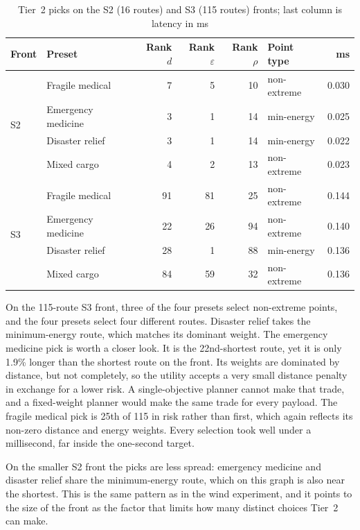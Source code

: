 \documentclass{ssnreview}
\begin{document}
\begin{table}[H]
\centering\caption{Tier~2 picks on the S2 (16 routes) and S3 (115 routes) fronts; last column is latency in ms}\label{tab:tier2}\footnotesize\setlength{\tabcolsep}{4pt}
\begin{tabular}{l l r r r l r}
\toprule
\textbf{Front} & \textbf{Preset} & \textbf{Rank $d$} & \textbf{Rank $\varepsilon$} & \textbf{Rank $\rho$} & \textbf{Point type} & \textbf{ms}\\
\midrule
\multirow{4}{*}{S2} & Fragile medical    & 7  & 5  & 10 & non-extreme & 0.030\\
                    & Emergency medicine & 3  & 1  & 14 & min-energy  & 0.025\\
                    & Disaster relief    & 3  & 1  & 14 & min-energy  & 0.022\\
                    & Mixed cargo        & 4  & 2  & 13 & non-extreme & 0.023\\
\midrule
\multirow{4}{*}{S3} & Fragile medical    & 91 & 81 & 25 & non-extreme & 0.144\\
                    & Emergency medicine & 22 & 26 & 94 & non-extreme & 0.140\\
                    & Disaster relief    & 28 & 1  & 88 & min-energy  & 0.136\\
                    & Mixed cargo        & 84 & 59 & 32 & non-extreme & 0.136\\
\bottomrule
\end{tabular}
\end{table}

On the 115-route S3 front, three of the four presets select non-extreme points, and the
four presets select four different routes. Disaster relief takes the minimum-energy
route, which matches its dominant weight. The emergency medicine pick is worth a closer
look. It is the 22nd-shortest route, yet it is only 1.9\% longer than the shortest route
on the front. Its weights are dominated by distance, but not completely, so the utility
accepts a very small distance penalty in exchange for a lower risk. A single-objective
planner cannot make that trade, and a fixed-weight planner would make the same trade for
every payload. The fragile medical pick is 25th of 115 in risk rather than first, which
again reflects its non-zero distance and energy weights. Every selection took well under
a millisecond, far inside the one-second target.

On the smaller S2 front the picks are less spread: emergency medicine and disaster
relief share the minimum-energy route, which on this graph is also near the shortest. This
is the same pattern as in the wind experiment, and it points to the size of the front as
the factor that limits how many distinct choices Tier~2 can make.
\end{document}
